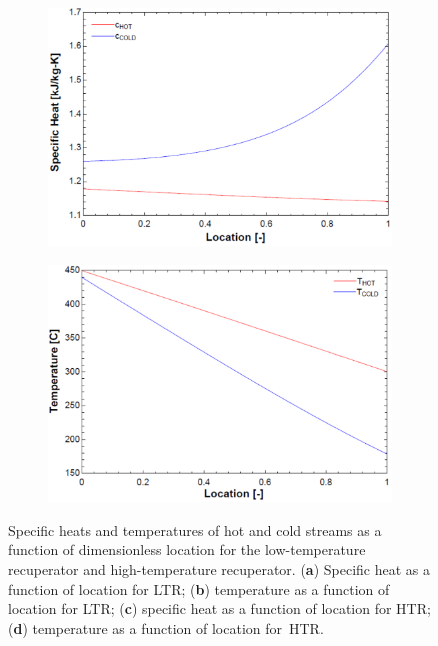 \documentclass[sustainability,article,accept,moreauthors,pdftex]{Definitions/mdpi}
\begin{document}
\begin{figure}[H]
\begin{subfigure}[b]{0.48\textwidth}
        \includegraphics[width=\textwidth]{Definitions/c-vs-p-htr.pdf}
        \caption[]%
        {{\small }}
        \label{graph-c-vs-p-htr}
    \end{subfigure}
    \hfill
    \begin{subfigure}[b]{0.48\textwidth}
        \includegraphics[width=\textwidth]{Definitions/t-vs-p-htr.pdf}
        \caption[]%
        {{\small }}
        \label{graph-t-vs-p-htr}
    \end{subfigure}
    \caption{Specific heats and temperatures of hot and cold streams as a function of dimensionless location for the low-temperature recuperator and high-temperature recuperator. (\textbf{a}) Specific heat as a function of location for LTR; (\textbf{b}) temperature as a function of location for LTR; (\textbf{c}) specific heat as a function of location for HTR; (\textbf{d}) temperature as a function of location for~HTR.}
    \label{graphs-t-c-vs-p} 
\end{figure}
\end{document}
